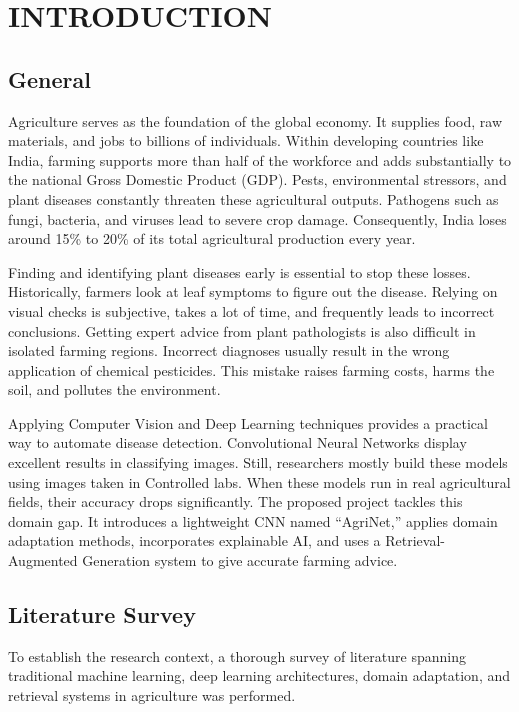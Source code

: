 \documentclass[12pt, a4paper]{report}
\begin{document}
\tableofcontents
\listoftables
\listoffigures

\clearpage
{}

\chapter{INTRODUCTION}

\section{General}
Agriculture serves as the foundation of the global economy. It supplies food, raw materials, and jobs to billions of individuals. Within developing countries like India, farming supports more than half of the workforce and adds substantially to the national Gross Domestic Product (GDP). Pests, environmental stressors, and plant diseases constantly threaten these agricultural outputs. Pathogens such as fungi, bacteria, and viruses lead to severe crop damage. Consequently, India loses around 15\% to 20\% of its total agricultural production every year.

Finding and identifying plant diseases early is essential to stop these losses. Historically, farmers look at leaf symptoms to figure out the disease. Relying on visual checks is subjective, takes a lot of time, and frequently leads to incorrect conclusions. Getting expert advice from plant pathologists is also difficult in isolated farming regions. Incorrect diagnoses usually result in the wrong application of chemical pesticides. This mistake raises farming costs, harms the soil, and pollutes the environment.

Applying Computer Vision and Deep Learning techniques provides a practical way to automate disease detection. Convolutional Neural Networks display excellent results in classifying images. Still, researchers mostly build these models using images taken in Controlled labs. When these models run in real agricultural fields, their accuracy drops significantly. The proposed project tackles this domain gap. It introduces a lightweight CNN named ``AgriNet,'' applies domain adaptation methods, incorporates explainable AI, and uses a Retrieval-Augmented Generation system to give accurate farming advice.

\section{Literature Survey}
To establish the research context, a thorough survey of literature spanning traditional machine learning, deep learning architectures, domain adaptation, and retrieval systems in agriculture was performed.
\end{document}
